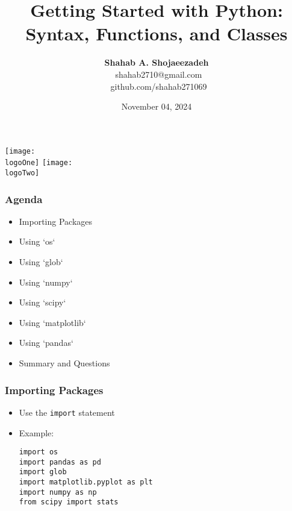 \documentclass{beamer}
\title{\textbf{Getting Started with Python: Syntax, Functions, and Classes}}
\author{\textbf{Shahab A. Shojaeezadeh} \\ \faEnvelope \, shahab2710@gmail.com \\ \faGithub \, github.com/shahab271069}
\date{November 04, 2024}
\newcommand{\logoOne}{boku.png} %
\newcommand{\logoTwo}{uni-kassel.png} %
\begin{document}
\begin{frame}[plain] %
    \begin{center}
        \texttt{[image: \\logoOne]} %
        \hfill
        \texttt{[image: \\logoTwo]} %
        \titlepage
    \end{center}
\end{frame}


\begin{frame}
    \frametitle{Agenda}
    \begin{itemize}
        \item Importing Packages
        \item Using `os`
        \item Using `glob`
        \item Using `numpy`
        \item Using `scipy`
        \item Using `matplotlib`
        \item Using `pandas`
        \item Summary and Questions
    \end{itemize}
\end{frame}

\begin{frame}
    \frametitle{Importing Packages}
    \begin{itemize}
        \item Use the \texttt{import} statement
        \item Example:
        \begin{tcolorbox}[colback=lightblue, colframe=darkblue, title=Import Example]
            \lstinline|import os| \\
            \lstinline|import pandas as pd| \\
            \lstinline|import glob| \\
            \lstinline|import matplotlib.pyplot as plt| \\
            \lstinline|import numpy as np| \\
            \lstinline|from scipy import stats|
        \end{tcolorbox}
    \end{itemize}
\end{frame}
\end{document}
